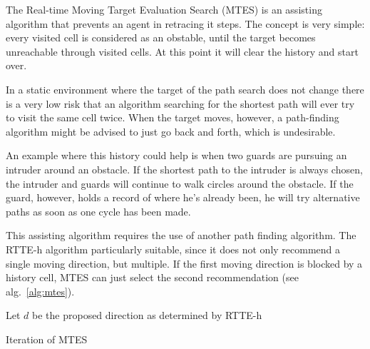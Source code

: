 The Real-time Moving Target Evaluation Search (MTES) is an assisting algorithm that prevents an agent in retracing it steps. The concept is very simple: every visited cell is considered as an obstable, until the target becomes unreachable through visited cells. At this point it will clear the history and start over.

			In a static environment where the target of the path search does not change there is a very low risk that an algorithm searching for the shortest path will ever try to visit the same cell twice. When the target moves, however, a path-finding algorithm might be advised to just go back and forth, which is undesirable.

			An example where this history could help is when two guards are pursuing an intruder around an obstacle. If the shortest path to the intruder is always chosen, the intruder and guards will continue to walk circles around the obstacle. If the guard, however, holds a record of where he's already been, he will try alternative paths as soon as one cycle has been made.

			This assisting algorithm requires the use of another path finding algorithm. The RTTE-h algorithm particularly suitable, since it does not only recommend a single moving direction, but multiple. If the first moving direction is blocked by a history cell, MTES can just select the second recommendation (see alg.~\ref{alg:mtes}).

			\begin{algorithm}[H]
				Let $d$ be the proposed direction as determined by RTTE-h\;
				\label{alg:mtes}
				\caption{Iteration of MTES~\protect\cite{undeger2010multi}}
			\end{algorithm}